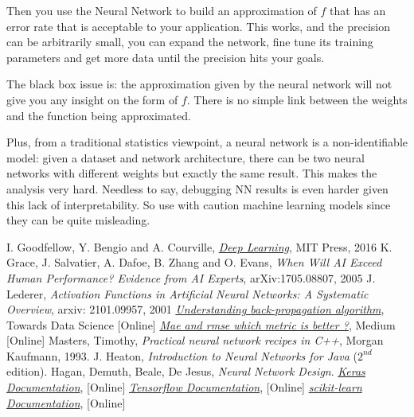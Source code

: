 Then you use the Neural Network to build an approximation of $f$ that has an error rate that is acceptable to your application. This works, and the precision can be arbitrarily small, you can expand the network, fine tune its training parameters and get more data until the precision hits your goals.

The black box issue is: the approximation given by the neural network will not give you any insight on the form of $f$. There is no simple link between the weights and the function being approximated. 

Plus, from a traditional statistics viewpoint, a neural network is a non-identifiable model: given a dataset and network architecture, there can be two neural networks with different weights but exactly the same result. This makes the analysis very hard.
Needless to say, debugging NN results is even harder given this lack of interpretability. So use with caution machine learning models since they can be quite misleading.
 
\begin{thebibliography}{9}
 I. Goodfellow, Y. Bengio and A. Courville, \href{http://www.deeplearningbook.org}{\emph{Deep Learning}}, MIT Press, 2016
K. Grace, J. Salvatier, A. Dafoe, B. Zhang and O. Evans, \emph{When Will AI Exceed Human Performance? Evidence from AI Experts}, arXiv:1705.08807, 2005
 J. Lederer, \emph{Activation Functions in Artificial Neural Networks: A Systematic Overview}, arxiv: 2101.09957, 2001
\href{https://towardsdatascience.com/understanding-backpropagation-algorithm-7bb3aa2f95fd}{\emph{Understanding back-propagation algorithm}}, Towards Data Science [Online]
\href{https://medium.com/human-in-a-machine-world/mae-and-rmse-which-metric-is-better-e60ac3bde13d}{\emph{Mae and rmse which metric is better ?}}, Medium [Online]
 Masters, Timothy, \emph{Practical neural network recipes in C++}, Morgan Kaufmann, 1993.
 J. Heaton, \emph{Introduction to Neural Networks for Java} ($2^{nd}$ edition).
 Hagan, Demuth, Beale, De Jesus, \emph{Neural Network Design}.
\href{https://keras.io/}{\emph{Keras Documentation}}, [Online]  
\href{https://www.tensorflow.org/}{\emph{Tensorflow Documentation}}, [Online] 
\href{https://scikit-learn.org/stable/}{\emph{scikit-learn Documentation}}, [Online]
\end{thebibliography}
